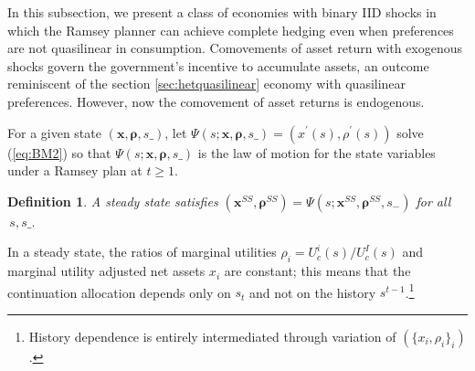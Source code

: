 \documentclass[thmsb,11pt]{article}
\newtheorem{definition}{Definition}
\begin{document}
In this  subsection, we  present  a class of  economies with binary IID shocks  in which  the Ramsey planner can achieve complete hedging even when preferences are not quasilinear in consumption. %
 Comovements of   asset return with exogenous shocks govern the government's incentive to accumulate assets, an outcome reminiscent of the section \ref{sec:hetquasilinear}  economy with quasilinear preferences.
However, now the comovement of asset returns is endogenous.

For a given state $\left(
\bm{x},\bm{\rho },s\_\right) $, let  $\Psi \left( s;\bm{x},%
\bm{\rho },s\_\right) =\left( x^{\prime }\left( s\right) ,\rho ^{\prime
}\left( s\right) \right) $  solve (\ref{eq:BM2}) so that $\Psi \left( s;\bm{x},\bm{\rho },s\_\right) $ is the law of motion for the state variables
under a Ramsey plan at $t \geq 1$.
\begin{definition} \label{defn: steady state}
 A steady state %
 satisfies $\left(\bm{ x}^{SS},\bm{\rho}
^{SS}\right) =\Psi \left( s;\bm{x}^{SS},\bm{\rho} ^{SS},s_{-}\right) $ for all $%
\,s,s\_.$
\end{definition}
In a steady state, the ratios  of marginal utilities  $\rho_i =U_{c}^{i}(s)/U_{c}^{I}(s)$ and marginal utility adjusted net assets $x_i$ are constant;
this means that the continuation allocation depends only on  $s_{t}$ and not on the  history $s^{t-1}$.\footnote{History dependence
is entirely intermediated through variation of $(\{x_i,\rho_i\}_i)$.}



\color{black}
\end{document}

